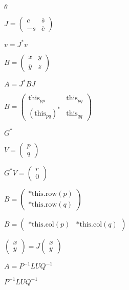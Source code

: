 \documentclass{article}
\begin{document}
$ \theta $
\pagebreak

$ J = \left ( \begin{array}{cc} c & \overline s \\ -s  & \overline c \end{array} \right ) $
\pagebreak

$ v = J^* v $
\pagebreak

$ B = \left ( \begin{array}{cc} x & y \\ \overline y & z \end{array} \right )$
\pagebreak

$ A = J^* B J $
\pagebreak

$ B = \left ( \begin{array}{cc} \text{this}_{pp} & \text{this}_{pq} \\ (\text{this}_{pq})^* & \text{this}_{qq} \end{array} \right )$
\pagebreak

$ G^* $
\pagebreak

$ V = \left ( \begin{array}{c} p \\ q \end{array} \right )$
\pagebreak

$ G^* V = \left ( \begin{array}{c} r \\ 0 \end{array} \right )$
\pagebreak

$ B = \left ( \begin{array}{cc} \text{*this.row}(p) \\ \text{*this.row}(q) \end{array} \right ) $
\pagebreak

$ B = \left ( \begin{array}{cc} \text{*this.col}(p) & \text{*this.col}(q) \end{array} \right ) $
\pagebreak

$ \left ( \begin{array}{cc} x \\ y \end{array} \right )  =  J \left ( \begin{array}{cc} x \\ y \end{array} \right ) $
\pagebreak

$ A = P^{-1} L U Q^{-1} $
\pagebreak

$ P^{-1} L U Q^{-1} $
\pagebreak
\end{document}
